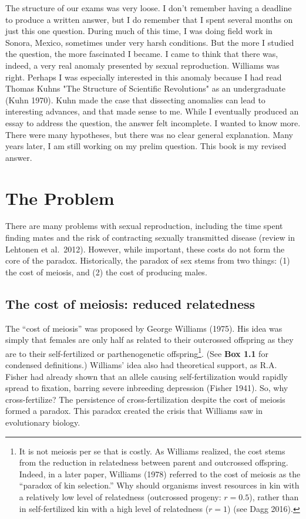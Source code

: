 \documentclass[
  letterpaper,
]{book}
\begin{document}
The structure of our exams was very loose. I don't remember having a
deadline to produce a written answer, but I do remember that I spent
several months on just this one question. During much of this time, I
was doing field work in Sonora, Mexico, sometimes under very harsh
conditions. But the more I studied the question, the more fascinated I
became. I came to think that there was, indeed, a very real anomaly
presented by sexual reproduction. Williams was right. Perhaps I was
especially interested in this anomaly because I had read Thomas
Kuhn\textquotesingle s "The Structure of Scientific Revolutions" as an
undergraduate (Kuhn 1970). Kuhn made the case that dissecting anomalies
can lead to interesting advances, and that made sense to me. While I
eventually produced an essay to address the question, the answer felt
incomplete. I wanted to know more. There were many hypotheses, but there
was no clear general explanation. Many years later, I am still working
on my prelim question. This book is my revised answer.

\hypertarget{the-problem}{%
\section{The Problem}\label{the-problem}}

There are many problems with sexual reproduction, including the time
spent finding mates and the risk of contracting sexually transmitted
disease (review in Lehtonen et al.~2012). However, while important,
these costs do not form the core of the paradox. Historically, the
paradox of sex stems from two things: (1) the cost of meiosis, and (2)
the cost of producing males.

\hypertarget{the-cost-of-meiosis-reduced-relatedness}{%
\subsection{The cost of meiosis: reduced
relatedness}\label{the-cost-of-meiosis-reduced-relatedness}}

The ``cost of meiosis'' was proposed by George Williams (1975). His idea
was simply that females are only half as related to their outcrossed
offspring as they are to their self-fertilized or parthenogenetic
offspring\footnote{It is not meiosis per se that is costly. As Williams
  realized, the cost stems from the reduction in relatedness between
  parent and outcrossed offspring. Indeed, in a later paper, Williams
  (1978) referred to the cost of meiosis as the ``paradox of kin
  selection.'' Why should organisms invest resources in kin with a
  relatively low level of relatedness (outcrossed progeny: \(r = 0.5\)),
  rather than in self-fertilized kin with a high level of relatedness
  (\(r = 1\)) (see Dagg 2016).}. (See \textbf{Box 1.1} for condensed
definitions.) Williams' idea also had theoretical support, as R.A.
Fisher had already shown that an allele causing self-fertilization would
rapidly spread to fixation, barring severe inbreeding depression (Fisher
1941). So, why cross-fertilize? The persistence of cross-fertilization
despite the cost of meiosis formed a paradox. This paradox created the
crisis that Williams saw in evolutionary biology.
\end{document}
